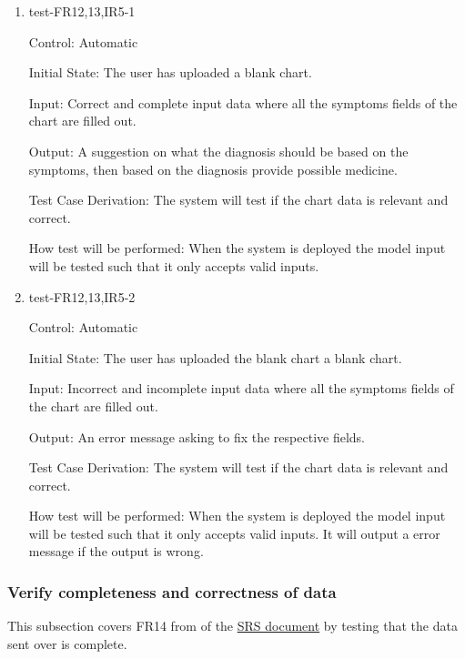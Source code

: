 \documentclass[12pt, titlepage]{article}
\begin{document}
\begin{enumerate}

\item{test-FR12,13,IR5-1} \label{test-FR12,13,IR5-1}

Control: Automatic

Initial State: The user has uploaded a blank chart.

Input: Correct and complete input data where all the symptoms fields of the chart are filled out.

Output: A suggestion on what the diagnosis should be based on the symptoms, then based on the diagnosis provide possible medicine.

Test Case Derivation: The system will test if the chart data is relevant and correct.  

How test will be performed: When the system is deployed the model input will be tested such that it only accepts valid inputs.

\item{test-FR12,13,IR5-2} \label{test-FR12,13,IR5-2}

Control: Automatic

Initial State: The user has uploaded the blank chart a blank chart.

Input: Incorrect and incomplete input data where all the symptoms fields of the chart are filled out.

Output: An error message asking to fix the respective fields.

Test Case Derivation: The system will test if the chart data is relevant and correct.  

How test will be performed: When the system is deployed the model input will be tested such that it only accepts valid inputs. It will output a error message if the output is wrong.

\end{enumerate}


\subsubsection{Verify completeness and correctness of data}\label{section:4.1.8}
This subsection covers FR14 from of the \href{https://github.com/Inreet-Kaur/capstone/blob/main/docs/SRS/SRS.pdf}{SRS document} \citep{SRS} by testing that the data sent over is complete.
\end{document}
